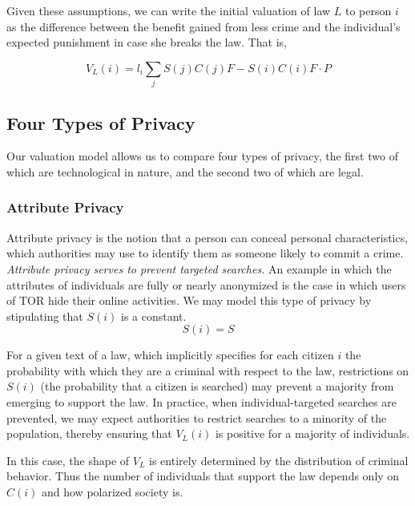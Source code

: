 Given these assumptions, we can write the initial valuation of law $L$ to person $i$ as the difference between the benefit gained from less crime and the individual's expected punishment in case she breaks the law. That is,  

$$V_L(i) = l_i \sum_j S(j)C(j)F - S(i)C(i)F\cdot P$$


\subsection{Four Types of Privacy}
Our valuation model allows us to compare four types of privacy, the first two of which are technological in nature, and the second  two of which are legal.

\subsubsection{Attribute Privacy}

Attribute privacy is the notion that a person can conceal personal characteristics, which authorities may use to identify them as someone likely to commit a crime. \emph{Attribute privacy serves to prevent targeted searches.}  An example in which the attributes of individuals are fully or nearly anonymized is the case in which users of TOR hide their online activities. We may model this type of privacy by stipulating that $S(i)$ is a constant.
$$S(i)=S$$

For a given text of a law, which implicitly specifies for each citizen $i$ the probability with which they are a criminal with respect to the law, restrictions on $S(i)$ (the probability that a citizen is searched) may prevent a majority from emerging to support the law.  %
 In practice, when individual-targeted searches are prevented, we may expect authorities to restrict searches to a minority of the population, thereby ensuring that $V_L(i)$ is positive for a majority of individuals.

In this case, the shape of $V_L$ is entirely determined by the distribution of criminal behavior. Thus the number of individuals that support the law depends only on $C(i)$ and how polarized society is.

